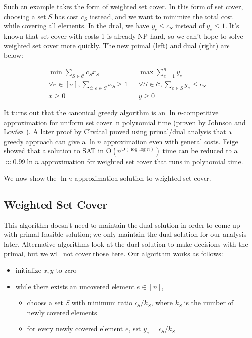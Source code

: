 \documentclass[11pt]{article}
\newcommand{\C}{\mathcal{C}}
\newcommand{\bigO}{\text{O}}
\begin{document}
Such an example takes the form of weighted set cover.  In this form of set cover, choosing a set $S$ has cost $c_S$ instead, and we want to minimize the total cost while covering all elements.  In the dual, we have $y_e \le c_S$ instead of $y_e \le 1$.  It's known that set cover with costs 1 is already NP-hard, so we can't hope to solve weighted set cover more quickly.  The new primal (left) and dual (right) are below:
\begin{framed}\begin{align*}
\min \sum_{S \in \C} c_Sx_S && \max \sum_{e = 1}^n y_e \\
\forall e \in [n], \sum_{S \text{: }e \in S} x_S \ge 1 && \forall S \in \C, \sum_{e \in S} y_e \le c_S\\
x \ge 0 && y \ge 0
\end{align*}\end{framed}
It turns out that the canonical greedy algorithm is an $\ln n$-competitive approximation for uniform set cover in polynomial time (proven by Johnson \cite{Johnson74} and Lov\'{a}sz \cite{Lovasz75}).  A later proof by Chv\'{a}tal \cite{Chvatal79} proved using primal/dual analysis that a greedy approach can give a $\ln n$ approximation even with general costs.  Feige \cite{Feige98} showed that a solution to SAT in $\bigO(n^{\bigO(\log \log n)})$ time can be reduced to a $\approx 0.99 \ln n$ approximation for weighted set cover that runs in polynomial time.

We now show the $\ln n$-approximation solution to weighted set cover.

\subsection{Weighted Set Cover}
This algorithm doesn't need to maintain the dual solution in order to come up with primal feasible solution; we only maintain the dual solution for our analysis later.  Alternative algorithms look at the dual solution to make decisions with the primal, but we will not cover those here.  Our algorithm works as follows:
\begin{itemize}
\setlength\itemsep{0cm}
\item initialize $x,y$ to zero
\item while there exists an uncovered element $e \in [n]$,
	\begin{itemize}
	\setlength\itemsep{0cm}
	\item choose a set $S$ with minimum ratio $c_S/k_S$, where $k_S$ is the number of newly covered elements
	\item for every newly covered element $e$, set $y_e = c_S / k_S$
	\end{itemize}
\end{itemize}
\end{document}
